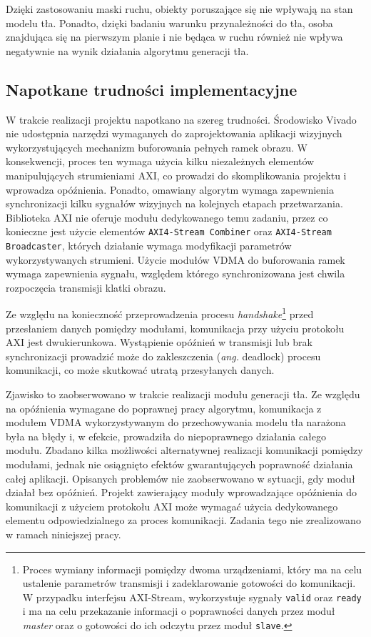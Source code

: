Dzięki zastosowaniu maski ruchu, obiekty poruszające się nie wpływają na stan modelu tła. Ponadto, dzięki badaniu warunku przynależności do tła, osoba znajdująca się na pierwszym planie i nie będąca w ruchu również nie wpływa negatywnie na wynik działania algorytmu generacji tła.




\subsection*{Napotkane trudności implementacyjne}

W trakcie realizacji projektu napotkano na szereg trudności. Środowisko Vivado nie udostępnia narzędzi wymaganych do zaprojektowania aplikacji wizyjnych wykorzystujących mechanizm buforowania pełnych ramek obrazu. W konsekwencji, proces ten wymaga użycia kilku niezależnych elementów manipulujących strumieniami AXI, co prowadzi do skomplikowania projektu i wprowadza opóźnienia.
Ponadto, omawiany algorytm wymaga zapewnienia synchronizacji kilku sygnałów wizyjnych na kolejnych etapach przetwarzania. Biblioteka AXI nie oferuje modułu dedykowanego temu zadaniu, przez co konieczne jest użycie elementów \texttt{AXI4-Stream Combiner} oraz \texttt{AXI4-Stream Broadcaster}, których działanie wymaga modyfikacji parametrów wykorzystywanych strumieni.
Użycie modułów VDMA do buforowania ramek wymaga zapewnienia sygnału, względem którego synchronizowana jest chwila rozpoczęcia transmisji klatki obrazu.

Ze względu na konieczność przeprowadzenia procesu \textit{handshake}\footnote{Proces wymiany informacji pomiędzy dwoma urządzeniami, który ma na celu ustalenie parametrów transmisji i zadeklarowanie gotowości do komunikacji. W przypadku interfejsu AXI-Stream, wykorzystuje sygnały \texttt{valid} oraz \texttt{ready} i ma na celu przekazanie informacji o poprawności danych przez moduł \textit{master} oraz o gotowości do ich odczytu przez moduł \texttt{slave}.} przed przesłaniem danych pomiędzy modułami, komunikacja przy użyciu protokołu AXI jest dwukierunkowa. Wystąpienie opóźnień w transmisji lub brak synchronizacji prowadzić może do zakleszczenia (\emph{ang.} deadlock) procesu komunikacji, co może skutkować utratą przesyłanych danych.

Zjawisko to zaobserwowano w trakcie realizacji modułu generacji tła. Ze względu na opóźnienia wymagane do poprawnej pracy algorytmu, komunikacja z modułem VDMA wykorzystywanym do przechowywania modelu tła narażona była na błędy i, w efekcie, prowadziła do niepoprawnego działania całego modułu. Zbadano kilka możliwości alternatywnej realizacji komunikacji pomiędzy modułami, jednak nie osiągnięto efektów gwarantujących poprawność działania całej aplikacji. Opisanych problemów nie zaobserwowano w sytuacji, gdy moduł działał bez opóźnień.
Projekt zawierający moduły wprowadzające opóźnienia do komunikacji z użyciem protokołu AXI może wymagać użycia dedykowanego elementu odpowiedzialnego za proces komunikacji. Zadania tego nie zrealizowano w ramach niniejszej pracy.

